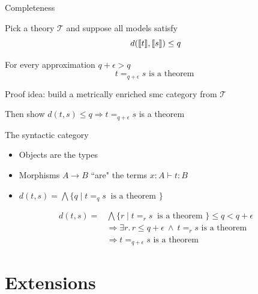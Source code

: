 \documentclass{beamer}
\begin{document}
\begin{frame}{Completeness}

        Pick a theory $\mathcal{T}$ and suppose all models satisfy
        \[
                d(\llbracket t \rrbracket,\llbracket s \rrbracket) \leq q
        \]

        \medskip
        For every \alert{approximation} $q + \epsilon > q$
        \[
                t =_{q + \epsilon} s \text{ is a theorem }
        \]

        \pause
        \bigskip
        Proof idea: build a metrically enriched smc category
        from $\mathcal{T}$

        Then show $d(t,s) \leq q \Longrightarrow t =_{q + \epsilon} s$ is a theorem
\end{frame}

\begin{frame}{The syntactic category}

        \begin{itemize}
                \item Objects are the types
                \item Morphisms $A \to B$ ``are"
                        the terms $x : A \vdash t : B$
                \item $d(t,s) = \bigwedge
                        \Big \{ q \mid t =_q s \> \text{ is a theorem } \Big \}$
        \end{itemize}

        \medskip
        \begin{align*}
                d(t,s) = & \bigwedge
                        \Big \{ r \mid t =_r s \> \text{ is a theorem } \Big \}
                        \leq q < q + \epsilon
                        \\
                         &
                         \Longrightarrow
                         \exists r. \,
                         r \leq q + \epsilon \> \wedge \>
                         t =_r s \text{ is a theorem }
                         \\
                         &
                         \Longrightarrow
                         t =_{q + \epsilon} s \text{ is a theorem }
        \end{align*}
\end{frame}

\section{Extensions}
\end{document}
